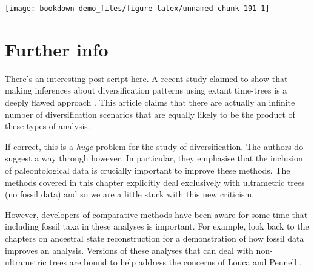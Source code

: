 \documentclass[
]{book}
\newenvironment{Shaded}{\begin{snugshade}}{\end{snugshade}}
\newcommand{\DataTypeTok}[1]{\textcolor[rgb]{0.13,0.29,0.53}{#1}}
\newcommand{\DecValTok}[1]{\textcolor[rgb]{0.00,0.00,0.81}{#1}}
\newcommand{\KeywordTok}[1]{\textcolor[rgb]{0.13,0.29,0.53}{\textbf{#1}}}
\newcommand{\NormalTok}[1]{#1}
\newcommand{\OperatorTok}[1]{\textcolor[rgb]{0.81,0.36,0.00}{\textbf{#1}}}
\newcommand{\StringTok}[1]{\textcolor[rgb]{0.31,0.60,0.02}{#1}}
\begin{document}
\begin{Shaded}
\end{Shaded}

\begin{center}\texttt{[image: bookdown-demo\_files/figure-latex/unnamed-chunk-191-1]} \end{center}

\hypertarget{further-info-5}{%
\section{Further info}\label{further-info-5}}

There's an interesting post-script here. A recent study claimed to show that making inferences about diversification patterns using extant time-trees is a deeply flawed approach \citep{Louca20}. This article claims that there are actually an infinite number of diversification scenarios that are equally likely to be the product of these types of analysis.

If correct, this is a \emph{huge} problem for the study of diversification. The authors do suggest a way through however. In particular, they emphasise that the inclusion of paleontological data is crucially important to improve these methods. The methods covered in this chapter explicitly deal exclusively with ultrametric trees (no fossil data) and so we are a little stuck with this new criticism.

However, developers of comparative methods have been aware for some time that including fossil taxa in these analyses is important. For example, look back to the chapters on ancestral state reconstruction for a demonstration of how fossil data improves an analysis. Versions of these analyses that can deal with non-ultrametric trees are bound to help address the concerns of Louca and Pennell \citeyearpar{Louca20}.
\end{document}
